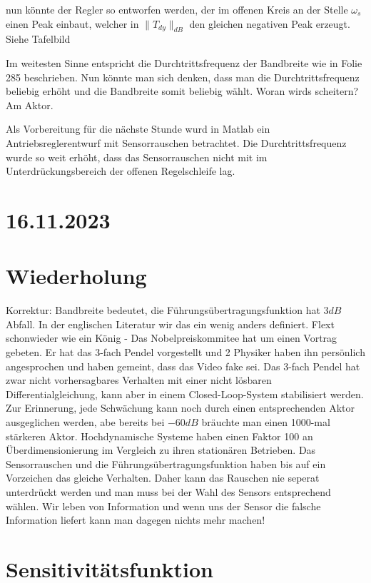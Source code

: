 \documentclass[a4paper]{article}
\begin{document}
nun könnte der Regler so entworfen werden, der im offenen Kreis an der Stelle $\omega_{s}$ einen Peak einbaut, welcher in $\|T_{dy}\|_{dB}$ den gleichen negativen Peak erzeugt.
Siehe Tafelbild

Im weitesten Sinne entspricht die Durchtrittsfrequenz der Bandbreite wie in Folie 285 beschrieben. Nun könnte man sich denken, dass man die Durchtrittsfrequenz beliebig erhöht und die Bandbreite somit beliebig wählt. Woran wirds scheitern? Am Aktor.

Als Vorbereitung für die nächste Stunde wurd in Matlab ein Antriebsreglerentwurf mit Sensorrauschen betrachtet. Die Durchtrittsfrequenz wurde so weit erhöht, dass das Sensorrauschen nicht mit im Unterdrückungsbereich der offenen Regelschleife lag. 

\section*{16.11.2023}
\section*{Wiederholung}
Korrektur: Bandbreite bedeutet, die Führungsübertragungsfunktion hat $3dB$ Abfall. In der englischen Literatur wir das ein wenig anders definiert.
Flext schonwieder wie ein König - Das Nobelpreiskommitee hat um einen Vortrag gebeten. Er hat das 3-fach Pendel vorgestellt und 2 Physiker haben ihn persönlich angesprochen und haben gemeint, dass das Video fake sei. Das 3-fach Pendel hat zwar nicht vorhersagbares Verhalten mit einer nicht lösbaren Differentialgleichung, kann aber in einem Closed-Loop-System stabilisiert werden.
Zur Erinnerung, jede Schwächung kann noch durch einen entsprechenden Aktor ausgeglichen werden, abe bereits bei  $-60dB$ bräuchte man einen 1000-mal stärkeren Aktor. Hochdynamische Systeme haben einen Faktor 100 an Überdimensionierung im Vergleich zu ihren stationären Betrieben.\newline
Das Sensorrauschen und die Führungsübertragungsfunktion haben bis auf ein Vorzeichen das gleiche Verhalten. Daher kann das Rauschen nie seperat unterdrückt werden und man muss bei der Wahl des Sensors entsprechend wählen. Wir leben von Information und wenn uns der Sensor die falsche Information liefert kann man dagegen nichts mehr machen!

 \section*{Sensitivitätsfunktion}
\end{document}
